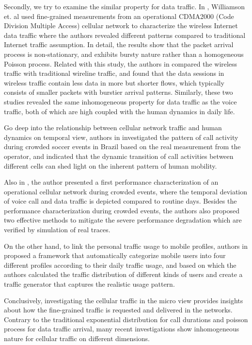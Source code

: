 Secondly, we try to examine the similar property for data traffic. In \cite{williamson2005characterization}, Williamson et. al used fine-grained measurements from an operational CDMA2000 (Code Division Multiple Access) cellular network to characterize the wireless Internet data traffic where the authors revealed different patterns compared to traditional Internet traffic assumption. In detail, the results show that the packet arrival process is non-stationary, and exhibits bursty nature rather than a homogeneous Poisson process. Related with this study, the authors in \cite{zhang2012understanding} compared the wireless traffic with traditional wireline traffic, and found that the data sessions in wireless traffic contain less data in more but shorter flows, which typically consists of smaller packets with burstier arrival patterns. Similarly, these two studies revealed the same inhomogeneous property for data traffic as the voice traffic, both of which are high coupled with the human dynamics in daily life.

Go deep into the relationship between cellular network traffic and human dynamics on temporal view, authors in \cite{xavier2012analyzing} investigated the pattern of call activity during crowded soccer events in Brazil based on the real measurement from the operator, and indicated that the dynamic transition of call activities between different cells can shed light on the inherent pattern of human mobility.

Also in \cite{shafiq2013crowd}, the author presented a first performance characterization of an operational cellular network during crowded events, where the temporal deviation of voice call and data traffic is depicted compared to routine days. Besides the performance characterization during crowded events, the authors also proposed two effective methods to mitigate the severe performance degradation which are verified by simulation of real traces.

On the other hand, to link the personal traffic usage to mobile profiles, authors in \cite{oliveira2015measurement} proposed a framework that automatically categorize mobile users into four different profiles according to their daily traffic usage, and based on which the authors calculated the traffic distribution of different kinds of users and create a traffic generator that captures the realistic usage pattern.

Conclusively, investigating the cellular traffic in the micro view provides insights about how the fine-grained traffic is requested and delivered in the networks. Contrary to the traditional exponential distribution for call durations and poisson process for data traffic arrival, many recent investigations show inhomogeneous nature for cellular traffic on different dimensions.

